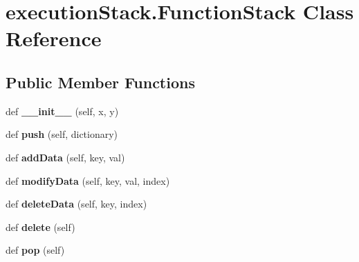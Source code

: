 \hypertarget{classexecution_stack_1_1_function_stack}{}\section{execution\+Stack.\+Function\+Stack Class Reference}
\label{classexecution_stack_1_1_function_stack}
\subsection*{Public Member Functions}
\begin{DoxyCompactItemize}
\item 
def {\bfseries \+\_\+\+\_\+init\+\_\+\+\_\+} (self, x, y)\hypertarget{classexecution_stack_1_1_function_stack_a7a601c313e47d7258f76e9fbf88adef7}{}\label{classexecution_stack_1_1_function_stack_a7a601c313e47d7258f76e9fbf88adef7}

\item 
def {\bfseries push} (self, dictionary)\hypertarget{classexecution_stack_1_1_function_stack_a9febcf526ee5b0c7b88e861a073627ac}{}\label{classexecution_stack_1_1_function_stack_a9febcf526ee5b0c7b88e861a073627ac}

\item 
def {\bfseries add\+Data} (self, key, val)\hypertarget{classexecution_stack_1_1_function_stack_a3a5ced032259c98b30344cbc6e775292}{}\label{classexecution_stack_1_1_function_stack_a3a5ced032259c98b30344cbc6e775292}

\item 
def {\bfseries modify\+Data} (self, key, val, index)\hypertarget{classexecution_stack_1_1_function_stack_a883469228441f12954d761586ce9fe5b}{}\label{classexecution_stack_1_1_function_stack_a883469228441f12954d761586ce9fe5b}

\item 
def {\bfseries delete\+Data} (self, key, index)\hypertarget{classexecution_stack_1_1_function_stack_a1c5e275752c116640cfe37c997050dff}{}\label{classexecution_stack_1_1_function_stack_a1c5e275752c116640cfe37c997050dff}

\item 
def {\bfseries delete} (self)\hypertarget{classexecution_stack_1_1_function_stack_ab68d818d8a7d65295384d00792805665}{}\label{classexecution_stack_1_1_function_stack_ab68d818d8a7d65295384d00792805665}

\item 
def {\bfseries pop} (self)\hypertarget{classexecution_stack_1_1_function_stack_a10c19ec4bd97f79d345bb979cf68fe9d}{}\label{classexecution_stack_1_1_function_stack_a10c19ec4bd97f79d345bb979cf68fe9d}

\end{DoxyCompactItemize}
